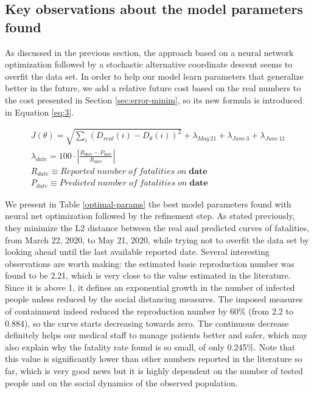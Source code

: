 \documentclass[11pt]{article}
\begin{document}
\subsection{Key observations about the model parameters found}

As discussed in the previous section, the approach based on a neural network optimization followed by a stochastic alternative coordinate descent seems to overfit the data set. In order to help our model learn parameters that generalize better in the future, we add a relative future cost based on the real numbers to the cost presented in Section \ref{sec:error-minim}, so its new formula is introduced in Equation \ref{eq:3}.

\begin{align}
    J(\theta) = \sqrt{\sum_i{(D_{real}(i) - D_{\theta}(i))^2}} + \lambda_{May\, 21} + \lambda_{June\, 3} + \lambda_{June\, 11} \label{eq:3}\\
    \lambda_{date} = 100 \cdot |\frac{R_{date} - P_{date}}{R_{date}}|\\
    R_{date} \equiv Reported\; number\; of\; fatalities\; on\; \textbf{date}\\
    P_{date} \equiv Predicted\; number\; of\; fatalities\; on\; \textbf{date}
\end{align}

We present in Table \ref{optimal-params} the best model parameters found with neural net optimization followed by the refinement step. As stated previously, they minimize the L2 distance between the real and predicted curves of fatalities, from  March 22, 2020, to May 21, 2020, while trying not to overfit the data set by looking ahead until the last available reported date. Several interesting observations are worth making: the estimated basic reproduction number was found to be 2.21, which is very close to the value estimated in the literature. Since it is above 1, it defines an exponential growth in the number of infected people unless reduced by the social distancing measures. The imposed measures of containment indeed reduced the reproduction number by 60\% (from 2.2 to 0.884), so the curve starts decreasing towards zero. The continuous decrease definitely helps our medical staff to manage patients better and safer, which may also explain why the fatality rate found is so small, of only 0.245\%. Note that this value is significantly lower than other numbers reported in the literature so far, which is very good news but it is highly dependent on the number of tested people and on the social dynamics of the observed population.
\end{document}
